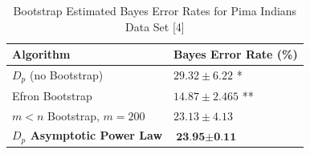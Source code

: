 \documentclass{article}
\begin{document}
	\begin{table}[!h]		
		\caption{Bootstrap Estimated Bayes Error Rates for Pima Indians Data Set [4]}
		\begin{center}
			\begin{tabular}[!h]{ |p{5cm}||p{4cm}|  }
				\hline
				Algorithm & Bayes Error Rate (\%) \\ [0.5ex] 
				\hline\hline
						$D_p$ (no Bootstrap) & $29.32 \pm 6.22$ * \\
						Efron Bootstrap  & $14.87 \pm 2.465$ ** 	\\
						$m < n$ Bootstrap, $m=200$ & $23.13 \pm 4.13$ 	\\
				\textbf{$D_p$ Asymptotic Power Law} & $\textbf{23.95} \pm \textbf{0.11}$\\ 
				\hline 		
			\end{tabular}
		\end{center}
	\end{table}
	
\end{document}
